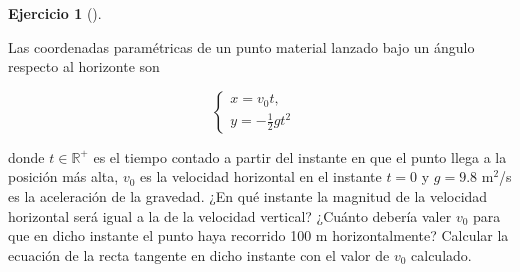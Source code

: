 \documentclass[
  spanish,
  a4paper,
]{scrreport}
\theoremstyle{definition}
\newtheorem{exercise}{Ejercicio}[chapter]
\theoremstyle{remark}
\begin{document}
\begin{exercise}[]\protect\hypertarget{exr-cinematica-2}{}\label{exr-cinematica-2}

Las coordenadas paramétricas de un punto material lanzado bajo un ángulo
respecto al horizonte son

\[
\begin{cases}
x=v_0t, & \\
y=-\frac{1}{2}gt^2
\end{cases}
\]

donde \(t\in \mathbb{R}^{+}\) es el tiempo contado a partir del instante
en que el punto llega a la posición más alta, \(v_0\) es la velocidad
horizontal en el instante \(t=0\) y \(g=9.8\) m\(^2\)/s es la
aceleración de la gravedad. ¿En qué instante la magnitud de la velocidad
horizontal será igual a la de la velocidad vertical? ¿Cuánto debería
valer \(v_0\) para que en dicho instante el punto haya recorrido 100 m
horizontalmente? Calcular la ecuación de la recta tangente en dicho
instante con el valor de \(v_0\) calculado.

\end{exercise}
\end{document}

